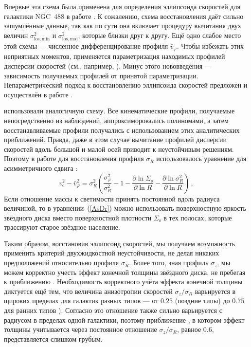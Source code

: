 \documentclass[russian,12pt]{article}
\begin{document}
Впервые эта схема была применена для определения эллипсоида скоростей 
для галактики NGC~488 в работе \cite{G+97}. К сожалению, схема 
восстановления даёт сильно зашумлённые данные, так как по сути она 
включает процедуру вычитания двух величин $\sigma_\mathrm{los,min}^2$ и 
$\sigma_\mathrm{los,maj}^2$, которые близки друг к другу. Ещё одно 
слабое место этой схемы --- численное дифференцирование профиля 
$\bar{v}_\varphi$. Чтобы избежать этих неприятных моментов, 
применяется параметризация находимых профилей дисперсии скоростей (см., 
например, \citealp{G+97,G+00,Sh+03}). Минус этого нововведения --- 
зависимость получаемых профилей от принятой параметризации.
Непараметрический подход к восстановлению эллипсоида скоростей 
предложен и осуществлён в работе \cite{N+08}. 

\cite{Silchenko+11} использовали аналогичную схему. Все кинематические 
профили, получаемые непосредственно из наблюдений, аппроксиморовались 
полиномами, а затем восстанавливаемые профили получались с 
использованием этих аналитических приближений. Правда, даже в этом 
случае вычитание профилей дисперсии скоростей вдоль большой и малой 
осей приводит к неустойчивым решениям. Поэтому в работе \cite{Silchenko+11} 
для восстановления профиля $\sigma_R$ использовалось уравнение для 
асимметричного сдвига \citep{BT87}: 
\begin{equation}
v_\mathrm{c}^2 - \bar{v}_\varphi^2 = 
\sigma_R^2 \left( 
\frac{\sigma_\varphi^2}{\sigma_R^2} -1 - 
\frac{\partial \ln \Sigma_\mathrm{s}}{\partial \ln R} - 
\frac{\partial \ln \sigma_R^2}{\partial \ln R}
\right) \, ,
\label{AsDr}
\end{equation}
Если отношение массы к светимости принять постоянной вдоль радиуса 
величиной, то в уравнении~(\ref{AsDr}) можно использовать поверхностную 
яркость звёздного диска вместо поверхностной плотности 
$\Sigma_\mathrm{s}$ в тех полосах, которые трассируют старое звёздное 
население.

Таким образом, восстановив эллипсоид скоростей, мы получаем возможность 
применить критерий двухжидкостной неустойчивости, не делая никаких 
предположений относительно профиля $\sigma_R$. Более того, зная профиль 
$\sigma_z$, мы можем корректно учесть эффект конечной толщины звёздного 
диска, не пребегая к приближению \cite{RW11}. Необходимость корректного 
учёта эффекта конечной толщины диктуется ещё тем, что величина 
анизотропии скоростей $\sigma_z / \sigma_R$ варьируется в щироких 
пределах для галактик разных типов --- от $0.25$ (поздние типы) до $0.75$ 
для ранних типов \citep{G+97,G+00,Sh+03,GSh12}). Согласно 
\cite{Silchenko+11} это отношение также сильно варьируется с радиусом в 
пределах одной галактики, поэтому приближение \cite{RW11}, в котором 
эффект толщины учитывается через постоянное отношение 
$\sigma_z / \sigma_R$, равное 0.6, представляется слишком грубым.
\end{document}
